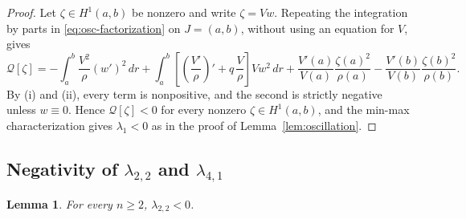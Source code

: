 \documentclass[11pt]{article}
\numberwithin{equation}{section}
\newtheorem{lemma}[theorem]{Lemma}
\theoremstyle{definition}
\begin{document}
\begin{proof}
Let $\zeta\in H^1(a,b)$ be nonzero and write $\zeta=Vw$. Repeating the integration by parts in \eqref{eq:osc-factorization} on $J=(a,b)$, without using an equation for $V$, gives
\[
    \mathcal Q[\zeta]
    =
    -\int_a^b\frac{V^2}{\rho}(w')^2\,dr
    +\int_a^b\left[\left(\frac{V'}{\rho}\right)'+q\,\frac{V}{\rho}\right]Vw^2\,dr
    +\frac{V'(a)}{V(a)}\frac{\zeta(a)^2}{\rho(a)}
    -\frac{V'(b)}{V(b)}\frac{\zeta(b)^2}{\rho(b)}.
\]
By (i) and (ii), every term is nonpositive, and the second is strictly negative unless $w\equiv0$. Hence $\mathcal Q[\zeta]<0$ for every nonzero $\zeta\in H^1(a,b)$, and the min-max characterization gives $\lambda_1<0$ as in the proof of Lemma~\ref{lem:oscillation}.
\end{proof}


\subsection{Negativity of $\lambda_{2,2}$ and $\lambda_{4,1}$}\label{ssec:negative}

\begin{lemma}\label{lem:lambda22}
For every $n\geq2$, $\lambda_{2,2}<0$.
\end{lemma}
\end{document}
